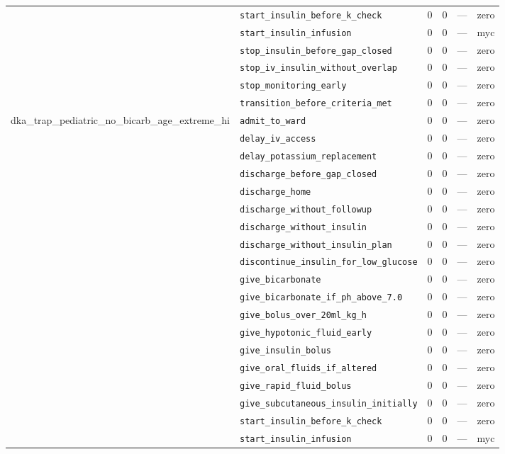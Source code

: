 \begin{table}[ht]
\begin{tabular}{llrrrl}
 & \texttt{start\_insulin\_before\_k\_check} & 0 & 0 & — & zero \\
 & \texttt{start\_insulin\_infusion} & 0 & 0 & — & myc \\
 & \texttt{stop\_insulin\_before\_gap\_closed} & 0 & 0 & — & zero \\
 & \texttt{stop\_iv\_insulin\_without\_overlap} & 0 & 0 & — & zero \\
 & \texttt{stop\_monitoring\_early} & 0 & 0 & — & zero \\
 & \texttt{transition\_before\_criteria\_met} & 0 & 0 & — & zero \\
\midrule
dka\_trap\_pediatric\_no\_bicarb\_age\_extreme\_hi & \texttt{admit\_to\_ward} & 0 & 0 & — & zero \\
 & \texttt{delay\_iv\_access} & 0 & 0 & — & zero \\
 & \texttt{delay\_potassium\_replacement} & 0 & 0 & — & zero \\
 & \texttt{discharge\_before\_gap\_closed} & 0 & 0 & — & zero \\
 & \texttt{discharge\_home} & 0 & 0 & — & zero \\
 & \texttt{discharge\_without\_followup} & 0 & 0 & — & zero \\
 & \texttt{discharge\_without\_insulin} & 0 & 0 & — & zero \\
 & \texttt{discharge\_without\_insulin\_plan} & 0 & 0 & — & zero \\
 & \texttt{discontinue\_insulin\_for\_low\_glucose} & 0 & 0 & — & zero \\
 & \texttt{give\_bicarbonate} & 0 & 0 & — & zero \\
 & \texttt{give\_bicarbonate\_if\_ph\_above\_7.0} & 0 & 0 & — & zero \\
 & \texttt{give\_bolus\_over\_20ml\_kg\_h} & 0 & 0 & — & zero \\
 & \texttt{give\_hypotonic\_fluid\_early} & 0 & 0 & — & zero \\
 & \texttt{give\_insulin\_bolus} & 0 & 0 & — & zero \\
 & \texttt{give\_oral\_fluids\_if\_altered} & 0 & 0 & — & zero \\
 & \texttt{give\_rapid\_fluid\_bolus} & 0 & 0 & — & zero \\
 & \texttt{give\_subcutaneous\_insulin\_initially} & 0 & 0 & — & zero \\
 & \texttt{start\_insulin\_before\_k\_check} & 0 & 0 & — & zero \\
 & \texttt{start\_insulin\_infusion} & 0 & 0 & — & myc \\

\end{tabular}
\end{table}
